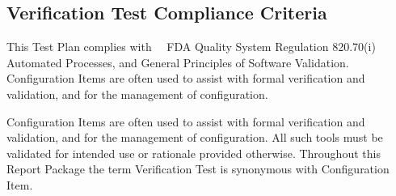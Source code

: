 \subsection{Verification Test Compliance Criteria}
This Test Plan complies with \sopSDLC\, \sopSCM\, FDA Quality System Regulation
820.70(i) Automated Processes, and General Principles of Software Validation.
Configuration Items are often used to assist with formal verification and
validation, and for the management of configuration.

Configuration Items are often used to assist with formal verification and
validation, and for the management of configuration.  All such tools must be
validated for intended use or rationale provided otherwise.  Throughout this
Report Package the term Verification Test is synonymous with Configuration Item.
